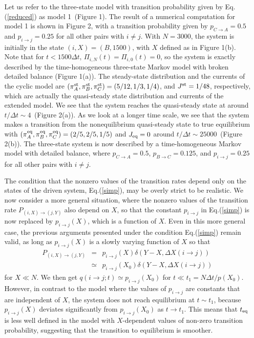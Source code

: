 \documentclass[aps,pre,amsmath,amssymb,floatfix,preprint,nofootinbib]{revtex4}
\begin{document}
 Let us refer to the three-state model with transition probability given by Eq.(\ref{reduced}) as model 1~(Figure 1). The result of a numerical computation for model 1 is shown in Figure 2, with a transition probability given by $p_{C \to A} = 0.5$ and $p_{i \to j} = 0.25$ for all other pairs with $i \ne j$. With $N=3000$, the system is initially in the state $(i,X)=(B,1500)$, with $X$ defined as in Figure 1(b). Note that for $t < 1500 \Delta t$, $\Pi_{i,N}(t) = \Pi_{i,0} (t)=0$, so the system is exactly described by the time-homogeneous three-state Markov model with broken detailed balance (Figure 1(a)). The steady-state distribution and the currents of the cyclic model are $(\pi^{\rm st}_A ,\pi^{\rm st}_B,\pi^{\rm st}_C) = (5/12,1/3,1/4)$, and $J^{\rm st} = 1/48$, respectively, which are actually the quasi-steady state distribution and currents of the extended model. We see that the system reaches the quasi-steady state at around $t/\Delta t \sim 4$~(Figure 2(a)). As we look at a longer time scale, we see that the system makes a transition from the nonequilibrium quasi-steady state to true equilibrium with $(\pi^{\rm eq}_A ,\pi^{\rm eq}_B,\pi^{\rm eq}_C) = (2/5,2/5,1/5)$ and $J_{\rm eq}=0$ around $t/\Delta t  \sim 25000 $~(Figure 2(b)). The three-state system is now described by a time-homogeneous Markov model with detailed balance, where $p_{C \to A} = 0.5$, $p_{B \to C} = 0.125$, and $p_{i \to j} = 0.25$ for all other pairs with $i \ne j$.
 
The condition that the nonzero values of the transition rates depend only on the states of the driven system, Eq.(\ref{simp}), may be overly strict to be realistic. We now consider a more general situation, where the nonzero values of the transition rate $P_{(i,X) \to (j,Y)}$ also depend on $X$, so that the constant $p_{i \to j}$ in Eq.(\ref{simp}) is now replaced by $p_{i \to j} (X) $, which is a function of $X$. Even in this more general case, the previous arguments presented under the condition Eq.(\ref{simp}) remain valid,  as long as $p_{i \to j}(X)$ is a slowly varying function of $X$ so that 
\begin{eqnarray}
P_{(i,X) \to (j,Y)} &=& p_{i \to j}(X)\delta(Y-X,\Delta X(i \to j))\nonumber\\
&\simeq& p_{i \to j}(X_0)\delta(Y-X,\Delta X(i \to j))  
\end{eqnarray}
for $X \ll N$. We then get $q(i \to j; t) \simeq p_{i \to j}(X_0)$ for $t \ll t_1 = N \Delta t/p(X_0)$. However, in contrast to the model where the values of $p_{i \to j}$ are constants that are independent of $X$, the system does not reach equilibrium at $t \sim t_1$, because $p_{i \to j}(X)$ deviates significantly from $p_{i \to j}(X_0)$ as $t \to t_1$. This means that $t_{\rm eq}$ is less well defined in the model with $X$-dependent values of non-zero transition probability, suggesting that the transition to equilibrium is smoother.
\end{document}
